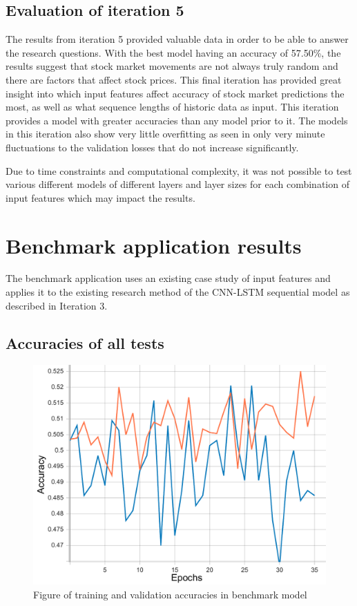 \subsection{Evaluation of iteration 5}
The results from iteration 5 provided valuable data in order to be able to answer the research questions. With the best model having an accuracy
of 57.50\%, the results suggest that stock market movements are not always truly random and there are factors that affect stock prices. This
final iteration has provided great insight into which input features affect accuracy of stock market predictions the most, as well as what
sequence lengths of historic data as input. This iteration provides a model with greater accuracies than any model prior to it. The models in this
iteration also show very little overfitting as seen in only very minute fluctuations to the validation losses that do not increase significantly.

Due to time constraints and computational complexity, it was not possible to test various different models of different layers and layer sizes
for each combination of input features which may impact the results.

\section{Benchmark application results}\label{benchmark_results}
The benchmark application uses an existing case study of input features and applies it to the existing research method of the CNN-LSTM sequential
model as described in Iteration 3.

\subsection{Accuracies of all tests}

\begin{figure}[ht]
    \centering
    \includegraphics[width=0.95\columnwidth]{figures/results/benchmark/benchmark_acc.pdf}
    \caption[Accuracies for benchmark model]{Figure of training and validation accuracies in benchmark model}
    \label{fig:benchmark_accuracy}
\end{figure}
\FloatBarrier

